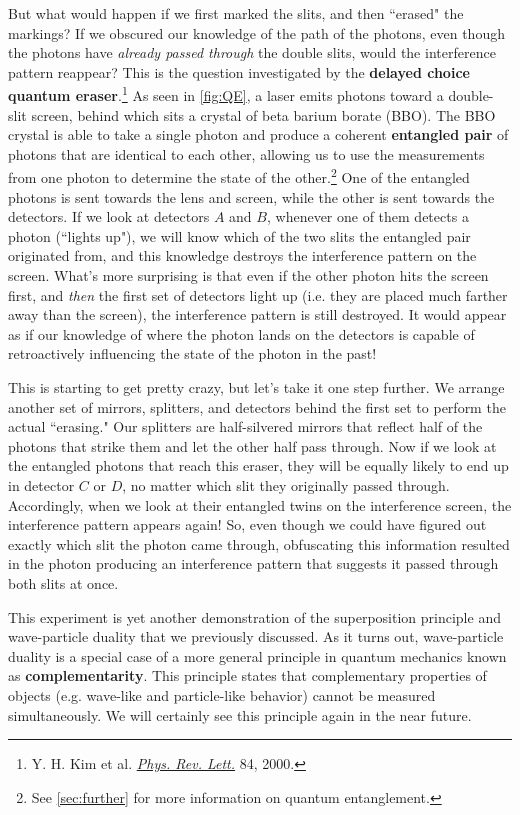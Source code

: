 But what would happen if we first marked the slits, and then ``erased" the markings? 
If we obscured our knowledge of the path of the photons, even though the photons have \emph{already passed through} the double slits, would the interference pattern reappear? 
This is the question investigated by the \textbf{delayed choice quantum eraser}.\footnote{Y. H. Kim et al. \href{https://journals.aps.org/prl/abstract/10.1103/PhysRevLett.84.1}{\emph{Phys. Rev. Lett.}} 84, 2000.} 
As seen in \autoref{fig:QE}, a laser emits photons toward a double-slit screen, behind which sits a crystal of beta barium borate (BBO). 
The BBO crystal is able to take a single photon and produce a coherent \textbf{entangled pair} of photons that are identical to each other, allowing us to use the measurements from one photon to determine the state of the other.\footnote{See \autoref{sec:further} for more information on quantum entanglement.} 
One of the entangled photons is sent towards the lens and screen, while the other is sent towards the detectors. 
If we look at detectors $A$ and $B$, whenever one of them detects a photon (``lights up"), we will know which of the two slits the entangled pair originated from, and this knowledge destroys the interference pattern on the screen. 
What's more surprising is that even if the other photon hits the screen first, and \emph{then} the first set of detectors light up (i.e. they are placed much farther away than the screen), the interference pattern is still destroyed. 
It would appear as if our knowledge of where the photon lands on the detectors is capable of retroactively influencing the state of the photon in the past! 

This is starting to get pretty crazy, but let's take it one step further. 
We arrange another set of mirrors, splitters, and detectors behind the first set to perform the actual ``erasing." 
Our splitters are half-silvered mirrors that reflect half of the photons that strike them and let the other half pass through. 
Now if we look at the entangled photons that reach this eraser, they will be equally likely to end up in detector $C$ or $D$, no matter which slit they originally passed through. 
Accordingly, when we look at their entangled twins on the interference screen, the interference pattern appears again! 
So, even though we could have figured out exactly which slit the photon came through, obfuscating this information resulted in the photon producing an interference pattern that suggests it passed through both slits at once. 

This experiment is yet another demonstration of the superposition principle and wave-particle duality that we previously discussed. 
As it turns out, wave-particle duality is a special case of a more general principle in quantum mechanics known as \textbf{complementarity}. 
This principle states that complementary properties of objects (e.g. wave-like and particle-like behavior) cannot be measured simultaneously. 
We will certainly see this principle again in the near future.


